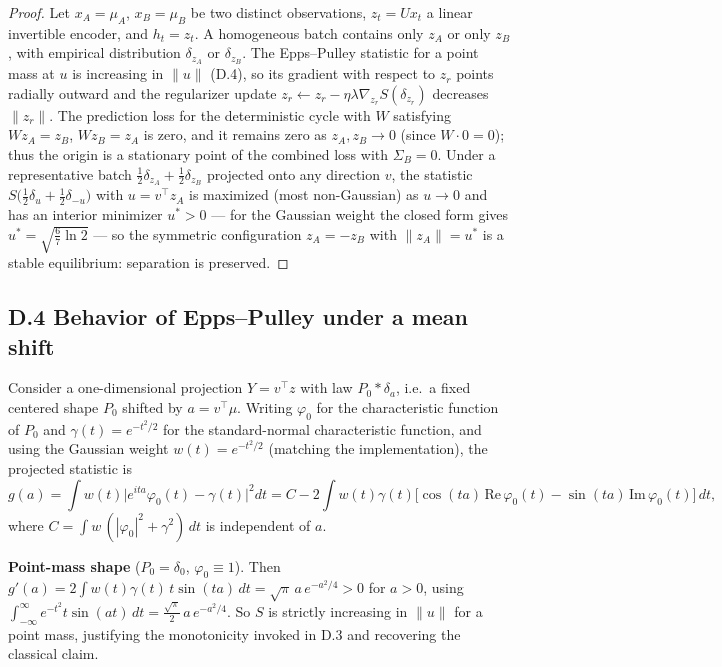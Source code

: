 \documentclass[10pt]{article}
\theoremstyle{remark}
\begin{document}
\begin{proof}
Let $x_A = \mu_A$, $x_B = \mu_B$ be two distinct observations, $z_t = U x_t$ a linear invertible encoder, and $h_t = z_t$. A homogeneous batch contains only $z_A$ or only $z_B$, with empirical distribution $\delta_{z_A}$ or $\delta_{z_B}$. The Epps--Pulley statistic for a point mass at $u$ is increasing in $\|u\|$ (D.4), so its gradient with respect to $z_r$ points radially outward and the regularizer update $z_r \leftarrow z_r - \eta \lambda \nabla_{z_r} S(\delta_{z_r})$ decreases $\|z_r\|$. The prediction loss for the deterministic cycle with $W$ satisfying $W z_A = z_B$, $W z_B = z_A$ is zero, and it remains zero as $z_A, z_B \to 0$ (since $W \cdot 0 = 0$); thus the origin is a stationary point of the combined loss with $\Sigma_B = 0$. Under a representative batch $\frac12 \delta_{z_A} + \frac12 \delta_{z_B}$ projected onto any direction $v$, the statistic $S\bigl(\frac12 \delta_u + \frac12 \delta_{-u}\bigr)$ with $u = v^\top z_A$ is maximized (most non-Gaussian) as $u \to 0$ and has an interior minimizer $u^* > 0$ --- for the Gaussian weight the closed form gives $u^* = \sqrt{\tfrac67 \ln 2}$ --- so the symmetric configuration $z_A = -z_B$ with $\|z_A\| = u^*$ is a stable equilibrium: separation is preserved.
\end{proof}

\subsection*{D.4 Behavior of Epps--Pulley under a mean shift}

Consider a one-dimensional projection $Y = v^\top z$ with law $P_0 * \delta_a$, i.e.\ a fixed centered shape $P_0$ shifted by $a = v^\top \mu$. Writing $\varphi_0$ for the characteristic function of $P_0$ and $\gamma(t) = e^{-t^2/2}$ for the standard-normal characteristic function, and using the Gaussian weight $w(t) = e^{-t^2/2}$ (matching the implementation), the projected statistic is
\[
g(a) = \int w(t) \bigl| e^{ita} \varphi_0(t) - \gamma(t) \bigr|^2 dt = C - 2\int w(t)\gamma(t)\bigl[\cos(ta)\,\mathrm{Re}\,\varphi_0(t) - \sin(ta)\,\mathrm{Im}\,\varphi_0(t)\bigr]\,dt,
\]
where $C = \int w\,(|\varphi_0|^2 + \gamma^2)\,dt$ is independent of $a$.

\textbf{Point-mass shape} ($P_0 = \delta_0$, $\varphi_0 \equiv 1$). Then $g'(a) = 2\int w(t)\gamma(t)\,t \sin(ta)\,dt = \sqrt{\pi}\, a\, e^{-a^2/4} > 0$ for $a > 0$, using $\int_{-\infty}^{\infty} e^{-t^2} t \sin(at)\,dt = \tfrac{\sqrt{\pi}}{2}\, a\, e^{-a^2/4}$. So $S$ is strictly increasing in $\|u\|$ for a point mass, justifying the monotonicity invoked in D.3 and recovering the classical claim.
\end{document}
